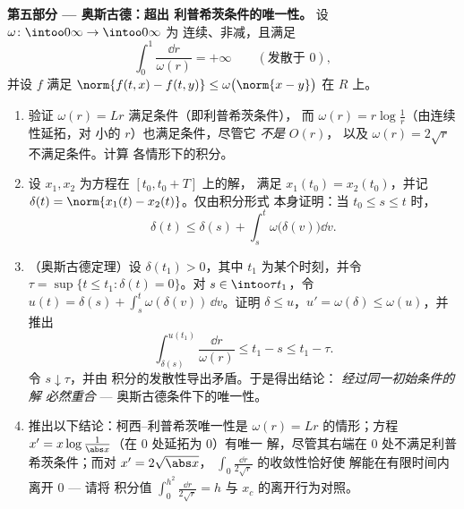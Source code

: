 \begin{problem}[{周末问题 --- 无利普希茨条件时
$x' = f(t, x)$ 解的存在性}]
\medskip
\noindent\textbf{第五部分 --- 奥斯古德：超出
利普希茨条件的唯一性。} 设 $\omega\colon\intoo0\infty\to\intoo0\infty$ 为
连续、非减，且满足
\[
\int_0^1\frac{\dd r}{\omega(r)} = +\infty
\qquad(\text{发散于 } 0),
\]
并设 $f$ 满足 $\norm{f(t, x) - f(t, y)} \leq
\omega\bigl(\norm{x - y}\bigr)$ 在 $R$ 上。
\begin{enumerate}[resume]
  \item 验证 $\omega(r) = Lr$ 满足条件（即利普希茨条件），
        而 $\omega(r) = r\log\frac1r$（由连续性延拓，对
        小的 $r$）也满足条件，尽管它 \emph{不是} $O(r)$，
        以及 $\omega(r) = 2\sqrt r$ 不满足条件。计算
        各情形下的积分。
  \item 设 $x_1, x_2$ 为方程在 $[t_0, t_0 + T]$ 上的解，
        满足 $x_1(t_0) = x_2(t_0)$，并记 $\delta(t) =
        \norm{x_1(t) - x_2(t)}$。仅由积分形式
        本身证明：当 $t_0 \leq s \leq t$ 时，
        \[
        \delta(t) \leq \delta(s) +
        \int_s^t\omega\bigl(\delta(v)\bigr)\dd v .
        \]
  \item （奥斯古德定理）设 $\delta(t_1) > 0$，其中
        $t_1$ 为某个时刻，并令 $\tau = \sup\{t \leq t_1 : \delta(t) =
        0\}$。对 $s \in \intoo\tau{t_1}$，令 $u(t) = \delta(s)
        + \int_s^t\omega(\delta(v))\,\dd v$。证明 $\delta \leq
        u$，$u' = \omega(\delta) \leq \omega(u)$，并推出
        \[
        \int_{\delta(s)}^{u(t_1)}\frac{\dd r}{\omega(r)}
        \leq t_1 - s \leq t_1 - \tau .
        \]
        令 $s \downarrow \tau$，并由
        积分的发散性导出矛盾。于是得出结论：
        \emph{经过同一初始条件的解
        必然重合} --- 奥斯古德条件下的唯一性。
  \item 推出以下结论：柯西--利普希茨唯一性是
        $\omega(r) = Lr$ 的情形；方程 $x' =
        x\log\frac1{\abs x}$（在 $0$ 处延拓为 $0$）有唯一
        解，尽管其右端在
        $0$ 处不满足利普希茨条件；而对 $x' = 2\sqrt{\abs x}$，
        $\int_0\frac{\dd r}{2\sqrt r}$ 的收敛性恰好使
        解能在有限时间内离开 $0$ --- 请将
        积分值 $\int_0^{h^2}\frac{\dd r}{2\sqrt r} = h$
        与 $x_c$ 的离开行为对照。
\end{enumerate}


\end{problem}
